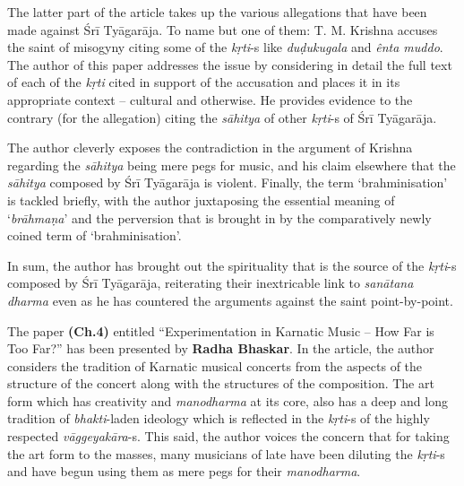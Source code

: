 The latter part of the article takes up the various allegations that have been made against Śrī Tyāgarāja. To name but one of them: T. M. Krishna accuses the saint of misogyny citing some of the \textit{kṛti}-s like \textit{duḍukugala} and \textit{ênta muddo}. The author of this paper addresses the issue by considering in detail the full text of each of the \textit{kṛti} cited in support of the accusation and places it in its appropriate context – cultural and otherwise. He provides evidence to the contrary (for the allegation) citing the \textit{sāhitya} of other \textit{kṛti}-s of Śrī Tyāgarāja.

The author cleverly exposes the contradiction in the argument of Krishna regarding the \textit{sāhitya} being mere pegs for music, and his claim elsewhere that the \textit{sāhitya} composed by Śrī Tyāgarāja is violent. Finally, the term ‘brahminisation’ is tackled briefly, with the author juxtaposing the essential meaning of ‘\textit{brāhmaṇa}’ and the perversion that is brought in by the comparatively newly coined term of ‘brahminisation’.

In sum, the author has brought out the spirituality that is the source of the \textit{kṛti}-s composed by Śrī Tyāgarāja, reiterating their inextricable link to \textit{sanātana dharma} even as he has countered the arguments against the saint point-by-point.

The paper \textbf{(Ch.4)} entitled “Experimentation in Karnatic Music – How Far is Too Far?” has been presented by \textbf{Radha Bhaskar}. In the article, the author considers the tradition of Karnatic musical concerts from the aspects of the structure of the concert along with the structures of the composition. The art form which has creativity and \textit{manodharma} at its core, also has a deep and long tradition of \textit{bhakti}-laden ideology which is reflected in the \textit{kṛti}-s of the highly respected \textit{vāggeyakāra}-s. This said, the author voices the concern that for taking the art form to the masses, many musicians of late have been diluting the \textit{kṛti}-s and have begun using them as mere pegs for their \textit{manodharma}.

